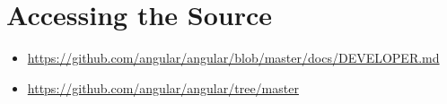 \section{Accessing the Source}


\begin{itemize}
  \item \url{https://github.com/angular/angular/blob/master/docs/DEVELOPER.md}
\end{itemize}


\begin{itemize}
  \item \url{https://github.com/angular/angular/tree/master}
\end{itemize}

